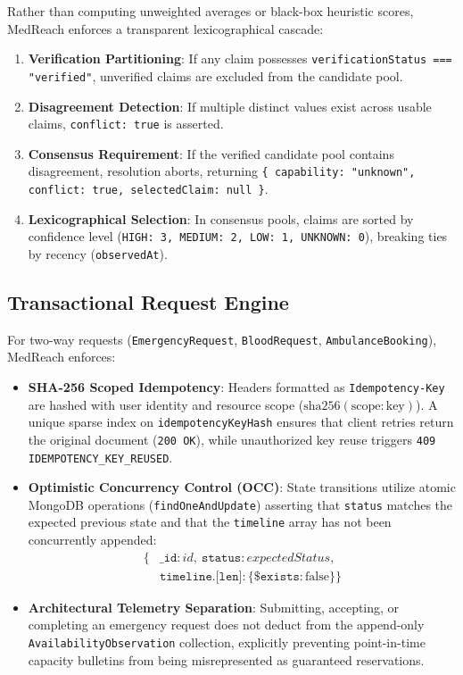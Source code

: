 \documentclass[conference]{IEEEtran}
\begin{document}
Rather than computing unweighted averages or black-box heuristic scores, MedReach enforces a transparent lexicographical cascade:
\begin{enumerate}
    \item \textbf{Verification Partitioning}: If any claim possesses \texttt{verificationStatus === "verified"}, unverified claims are excluded from the candidate pool.
    \item \textbf{Disagreement Detection}: If multiple distinct values exist across usable claims, \texttt{conflict: true} is asserted.
    \item \textbf{Consensus Requirement}: If the verified candidate pool contains disagreement, resolution aborts, returning \texttt{\{ capability: "unknown", conflict: true, selectedClaim: null \}}.
    \item \textbf{Lexicographical Selection}: In consensus pools, claims are sorted by confidence level (\texttt{HIGH: 3, MEDIUM: 2, LOW: 1, UNKNOWN: 0}), breaking ties by recency (\texttt{observedAt}).
\end{enumerate}

\subsection{Transactional Request Engine}
For two-way requests (\texttt{EmergencyRequest}, \texttt{BloodRequest}, \texttt{AmbulanceBooking}), MedReach enforces:
\begin{itemize}
    \item \textbf{SHA-256 Scoped Idempotency}: Headers formatted as \texttt{Idempotency-Key} are hashed with user identity and resource scope ($\text{sha256}(\text{scope}:\text{key})$). A unique sparse index on \texttt{idempotencyKeyHash} ensures that client retries return the original document (\texttt{200 OK}), while unauthorized key reuse triggers \texttt{409 IDEMPOTENCY\_KEY\_REUSED}.
    \item \textbf{Optimistic Concurrency Control (OCC)}: State transitions utilize atomic MongoDB operations (\texttt{findOneAndUpdate}) asserting that \texttt{status} matches the expected previous state and that the \texttt{timeline} array has not been concurrently appended:
    \begin{equation}
    \begin{aligned}
    \{ & \texttt{\_id}: id,\ \texttt{status}: expectedStatus, \\
      & \texttt{timeline.[len]}: \{ \texttt{\$exists}: \text{false} \} \}
    \end{aligned}
    \end{equation}
    \item \textbf{Architectural Telemetry Separation}: Submitting, accepting, or completing an emergency request does not deduct from the append-only \texttt{AvailabilityObservation} collection, explicitly preventing point-in-time capacity bulletins from being misrepresented as guaranteed reservations.
\end{itemize}
\end{document}
